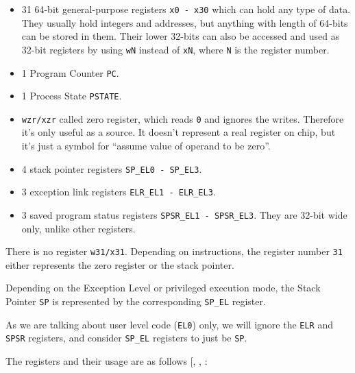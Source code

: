 \documentclass[a4paper, nobind]{templates/ociamthesis}
\providecommand{\tightlist}{%
  \setlength{\itemsep}{0pt}\setlength{\parskip}{0pt}}
\begin{document}
\begin{itemize}
\tightlist
\item
  31 64-bit general-purpose registers \texttt{x0\ -\ x30} which can hold any type of data.
  They usually hold integers and addresses, but anything with length of 64-bits
  can be stored in them. Their lower 32-bits can also be accessed and used as
  32-bit registers by using \texttt{wN} instead of \texttt{xN}, where \texttt{N} is the register number.
\item
  1 Program Counter \texttt{PC}.
\item
  1 Process State \texttt{PSTATE}.
\item
  \texttt{wzr/xzr} called zero register,
  which reads \texttt{0} and ignores the writes. Therefore it's only useful as a source.
  It doesn't represent a real register on chip,
  but it's just a symbol for ``assume value of operand to be zero''.
\item
  4 stack pointer registers \texttt{SP\_EL0\ -\ SP\_EL3}.
\item
  3 exception link registers \texttt{ELR\_EL1\ -\ ELR\_EL3}.
\item
  3 saved program status registers \texttt{SPSR\_EL1\ -\ SPSR\_EL3}. They are 32-bit wide only,
  unlike other registers.
\end{itemize}

There is no register \texttt{w31/x31}. Depending on instructions, the register number \texttt{31}
either represents the zero register or the stack pointer.

Depending on the Exception Level or privileged execution mode,
the Stack Pointer \texttt{SP} is represented by the corresponding \texttt{SP\_EL} register.

As we are talking about user level code (\texttt{EL0}) only, we will ignore the \texttt{ELR} and \texttt{SPSR}
registers, and consider \texttt{SP\_EL} registers to just be \texttt{SP}.

The registers and their usage are as follows {[}, , \citeproc{ref-arm-pcs}{12}{]}:
\end{document}
